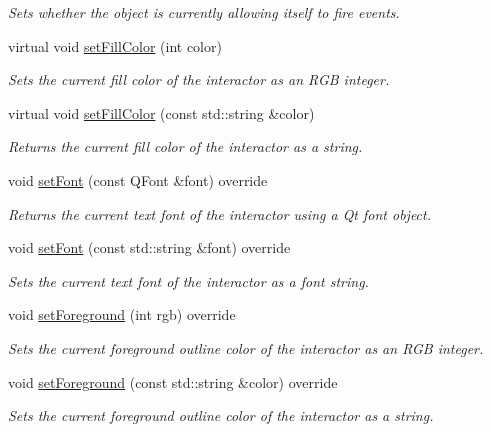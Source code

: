 \begin{DoxyCompactItemize}
\begin{DoxyCompactList}\small\item\em Sets whether the object is currently allowing itself to fire events. \end{DoxyCompactList}\item 
virtual void \mbox{\hyperlink{classGDrawingSurface_a47fad447b715f2f303538434eed26709}{set\+Fill\+Color}} (int color)
\begin{DoxyCompactList}\small\item\em Sets the current fill color of the interactor as an R\+GB integer. \end{DoxyCompactList}\item 
virtual void \mbox{\hyperlink{classGDrawingSurface_adbc18b1a930aadd97d7437f9f7265b96}{set\+Fill\+Color}} (const std\+::string \&color)
\begin{DoxyCompactList}\small\item\em Returns the current fill color of the interactor as a string. \end{DoxyCompactList}\item 
void \mbox{\hyperlink{classGCanvas_ad1d75b3840a41ba7d1e8a921696dc684}{set\+Font}} (const Q\+Font \&font) override
\begin{DoxyCompactList}\small\item\em Returns the current text font of the interactor using a Qt font object. \end{DoxyCompactList}\item 
void \mbox{\hyperlink{classGCanvas_a51367c9fd2709973b1f7238734f93891}{set\+Font}} (const std\+::string \&font) override
\begin{DoxyCompactList}\small\item\em Sets the current text font of the interactor as a font string. \end{DoxyCompactList}\item 
void \mbox{\hyperlink{classGCanvas_a59f7cd2bd1708c12dfa52a8f7c7b79c9}{set\+Foreground}} (int rgb) override
\begin{DoxyCompactList}\small\item\em Sets the current foreground outline color of the interactor as an R\+GB integer. \end{DoxyCompactList}\item 
void \mbox{\hyperlink{classGCanvas_a8afbcf1f47750fb4c717f9ff36540235}{set\+Foreground}} (const std\+::string \&color) override
\begin{DoxyCompactList}\small\item\em Sets the current foreground outline color of the interactor as a string. \end{DoxyCompactList}\item 

\end{DoxyCompactItemize}
